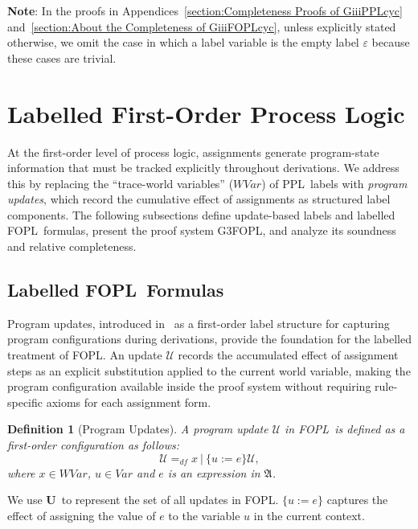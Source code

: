 \documentclass[manuscript,screen]{acmart}
\newtheorem{definition}{Definition}[section]
\newcommand{\mcl}[1]{\mathcal{#1}}
\newcommand{\mfr}[1]{\mathfrak{#1}}
\newcommand{\dddef}[0]{=_{df}}
\newcommand{\Var}[0]{\mathit{Var}}
\newcommand{\GiiiFOPLcyc}[0]{\mbox{G3FOPL}}
\newcommand{\Arith}[0]{\mbox{$\mfr{A}$}}
\newcommand{\WVar}[0]{\textit{WVar}}
\newcommand{\Upd}[0]{\textbf{U}}
\newcommand{\upd}[0]{\mcl{U}}
\newcommand{\PPL}[0]{\mbox{PPL}}
\newcommand{\FOPL}[0]{\mbox{FOPL}}
\begin{document}
\textbf{Note}:
In the proofs in Appendices~\ref{section:Completeness Proofs of GiiiPPLcyc} and~\ref{section:About the Completeness of GiiiFOPLcyc}, unless explicitly stated otherwise, we omit the case in which a label variable is the empty label $\varepsilon$ because these cases are trivial. 

\section{Labelled First-Order Process Logic}
\label{section:Labelled First-Order Process Logic - 2}


At the first-order level of process logic, assignments generate program-state information that must be tracked explicitly throughout derivations. We address this by replacing the ``trace-world variables'' ($\WVar$) of \PPL\ labels with \emph{program updates}, which record the cumulative effect of assignments as structured label components. 
 The following subsections define update-based labels and labelled \FOPL\ formulas, present the proof system \GiiiFOPLcyc, and analyze its soundness and relative completeness. 



\subsection{Labelled \FOPL\ Formulas}
\label{section:Labelled First-Order Process Logic}
Program updates, introduced in~\cite{Beckert13} as a first-order label structure for capturing program configurations during derivations, provide the foundation for the labelled treatment of \FOPL.  An update $\upd$ records the accumulated effect of assignment steps as an explicit substitution applied to the current world variable, making the program configuration available inside the proof system without requiring rule-specific axioms for each assignment form. 


\begin{definition}[Program Updates]
\label{def:Program Updates}
A program update $\upd$ in \FOPL\ is defined as a first-order configuration as follows: 
$$
\upd\dddef x\ |\ \{u := e\}\upd,
$$
where $x\in \WVar$, $u\in \Var$ and $e$ is an expression in $\Arith$. 
\end{definition}

We use \Upd\ to represent the set of all updates in \FOPL. 
$\{u:=e\}$ captures the effect of assigning the value of $e$ to the variable $u$ in the current context. 
\end{document}

